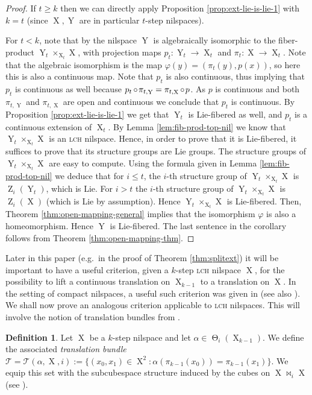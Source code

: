 \documentclass[a4paper,12pt,reqno]{amsart}
\theoremstyle{definition}
\newtheorem{defn}[theorem]{Definition}
\def\to{\rightarrow}
\newcommand{\mc}{\mathcal}
\DeclareMathOperator{\ab}{Z}
\DeclareMathOperator{\tran}{\Theta}
\DeclareMathOperator{\ns}{X}
\DeclareMathOperator{\nss}{Y}
\DeclareMathOperator{\co}{\circ\hspace{-0.02 cm}}
\begin{document}
\begin{proof}
If $t\ge k$ then we can directly apply Proposition \ref{prop:ext-lie-is-lie-1} with $k=t$ (since $\ns,\nss$ are in particular $t$-step nilspaces).

For $t<k$, note that by \cite[Proposition A.18]{CGSS-p-hom} the nilspace $\nss$ is algebraically isomorphic to the fiber-product $\nss_t\times_{\ns_t}\ns$, with projection maps $p_t:\nss_t\to\ns_t$ and $\pi_t:\ns\to\ns_t$. Note that the algebraic isomorphism is the map $\varphi(y)=(\pi_t(y),p(x))$, so here this is also a continuous map. Note that $p_t$ is also continuous, thus implying that $p_t$ is continuous as well because $p_t\co \pi_{t,\nss} = \pi_{t,\ns} \co p$. As $p$ is continuous and both $\pi_{t,\nss}$ and $\pi_{t,\ns}$ are open and continuous we conclude that $p_t$ is continuous. By Proposition \ref{prop:ext-lie-is-lie-1} we get that $\nss_t$ is Lie-fibered as well, and $p_t$ is a continuous extension of $\ns_t$. By Lemma \ref{lem:fib-prod-top-nil} we know that $\nss_t\times_{\ns_t}\ns$ is an \textsc{lch} nilspace. Hence, in order to prove that it is Lie-fibered, it suffices to prove that its structure groups are Lie groups.  The structure groups of $\nss_t\times_{\ns_t}\ns$ are easy to compute. Using the formula given in Lemma \ref{lem:fib-prod-top-nil} we deduce that for $i\le t$, the $i$-th structure group of $\nss_t\times_{\ns_t}\ns$ is $\ab_i(\nss_t)$, which is Lie. For $i>t$ the $i$-th structure group of $\nss_t\times_{\ns_t}\ns$ is $\ab_i(\ns)$ (which is Lie by assumption). Hence $\nss_t\times_{\ns_t}\ns$ is Lie-fibered. Then, Theorem \ref{thm:open-mapping-general} implies that the isomorphism  $\varphi$ is also a homeomorphism. Hence $\nss$ is Lie-fibered. The last sentence in the corollary follows from Theorem \ref{thm:open-mapping-thm}.
\end{proof}
\noindent Later in this paper (e.g.\ in the proof of Theorem \ref{thm:splitext}) it will be important to have a useful criterion, given a $k$-step \textsc{lch} nilspace $\ns$, for the possibility to lift a continuous translation on $\ns_{k-1}$ to a translation on $\ns$. In the setting of compact nilspaces, a useful such criterion was given in \cite{CamSzeg} (see also \cite[Proposition 3.3.39]{Cand:Notes1}). We shall now prove an analogous criterion applicable to \textsc{lch} nilspaces. This will involve the notion of translation bundles from \cite[Definition 3.3.34]{Cand:Notes1}.

\begin{defn}
Let $\ns$ be a $k$-step nilspace and let $\alpha\in \tran_i(\ns_{k-1})$. We define the associated \emph{translation bundle} $\mc{T}=\mc{T}(\alpha,\ns,i):=\{(x_0,x_1)\in \ns^2: \alpha(\pi_{k-1}(x_0))=\pi_{k-1}(x_1)\}$. We equip this set with the subcubespace structure induced by the cubes on $\ns\bowtie_i \ns$ (see \cite[\S 3.1.4]{Cand:Notes1}).
\end{defn}
\end{document}
